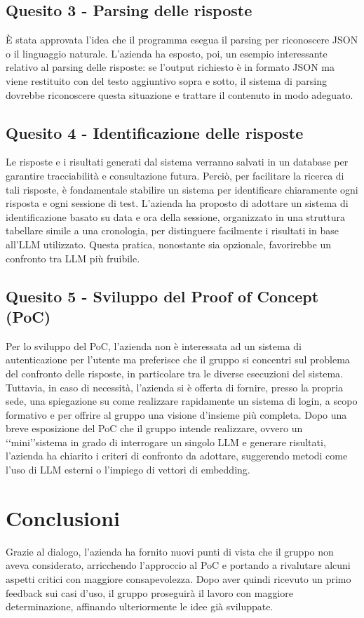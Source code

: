 \documentclass[10pt]{article}
\begin{document}
    \subsection{Quesito 3 - Parsing delle risposte}
    È stata approvata l’idea che il programma esegua il parsing per riconoscere JSON o il linguaggio naturale. L’azienda ha esposto, poi, un esempio interessante relativo al parsing delle risposte: se l’output richiesto è in formato JSON ma viene restituito con del testo aggiuntivo sopra e sotto, il sistema di parsing dovrebbe riconoscere questa situazione e trattare il contenuto in modo adeguato.

    \subsection{Quesito 4 - Identificazione delle risposte}
    Le risposte e i risultati generati dal sistema verranno salvati in un database per garantire tracciabilità e consultazione futura. Perciò, per facilitare la ricerca di tali risposte, è fondamentale stabilire un sistema per identificare chiaramente ogni risposta e ogni sessione di test. L’azienda ha proposto di adottare un sistema di identificazione basato su data e ora della sessione, organizzato in una struttura tabellare simile a una cronologia, per distinguere facilmente i risultati in base all’LLM utilizzato. Questa pratica, nonostante sia opzionale, favorirebbe un confronto tra LLM più fruibile.

    \subsection{Quesito 5 - Sviluppo del Proof of Concept (PoC)}
    Per lo sviluppo del PoC, l’azienda non è interessata ad un sistema di autenticazione per l’utente ma preferisce che il gruppo si concentri sul problema del confronto delle risposte, in particolare tra le diverse esecuzioni del sistema. Tuttavia, in caso di necessità, l’azienda si è offerta di fornire, presso la propria sede, una spiegazione su come realizzare rapidamente un sistema di login, a scopo formativo e per offrire al gruppo una visione d’insieme più completa.
    Dopo una breve esposizione del PoC che il gruppo intende realizzare, ovvero un \lq\lq mini\rq\rq sistema in grado di interrogare un singolo LLM e generare risultati, l’azienda ha chiarito i criteri di confronto da adottare, suggerendo metodi come l’uso di LLM esterni o l’impiego di vettori di embedding.


    \newpage
    
    \section{Conclusioni}
    Grazie al dialogo, l’azienda ha fornito nuovi punti di vista che il gruppo non aveva considerato, arricchendo l'approccio al PoC e portando a rivalutare alcuni aspetti critici con maggiore consapevolezza.
    Dopo aver quindi ricevuto un primo feedback sui casi d’uso, il gruppo proseguirà il lavoro con maggiore determinazione, affinando ulteriormente le idee già sviluppate.

    \newpage
    \newpage
\end{document}
